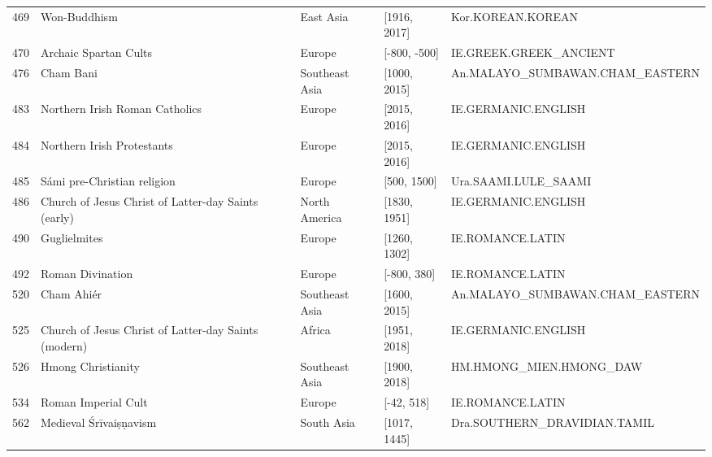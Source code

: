 {\begin{longtable}{rp{3.5cm}llp{3.5cm}}
469 & {\raggedright Won-Buddhism} & East Asia & [1916, 2017] & {\raggedright Kor.\allowbreak{}KOREAN.\allowbreak{}KOREAN} \\
470 & {\raggedright Archaic Spartan Cults} & Europe & [-800, -500] & {\raggedright IE.\allowbreak{}GREEK.\allowbreak{}GREEK\_\allowbreak{}ANCIENT} \\
476 & {\raggedright Cham Bani} & Southeast Asia & [1000, 2015] & {\raggedright An.\allowbreak{}MALAYO\_\allowbreak{}SUMBAWAN.\allowbreak{}CHAM\_\allowbreak{}EASTERN} \\
483 & {\raggedright Northern Irish Roman Catholics} & Europe & [2015, 2016] & {\raggedright IE.\allowbreak{}GERMANIC.\allowbreak{}ENGLISH} \\
484 & {\raggedright Northern Irish Protestants} & Europe & [2015, 2016] & {\raggedright IE.\allowbreak{}GERMANIC.\allowbreak{}ENGLISH} \\
485 & {\raggedright Sámi pre-Christian religion} & Europe & [500, 1500] & {\raggedright Ura.\allowbreak{}SAAMI.\allowbreak{}LULE\_\allowbreak{}SAAMI} \\
486 & {\raggedright Church of Jesus Christ of Latter-day Saints (early)} & North America & [1830, 1951] & {\raggedright IE.\allowbreak{}GERMANIC.\allowbreak{}ENGLISH} \\
490 & {\raggedright Guglielmites} & Europe & [1260, 1302] & {\raggedright IE.\allowbreak{}ROMANCE.\allowbreak{}LATIN} \\
492 & {\raggedright Roman Divination} & Europe & [-800, 380] & {\raggedright IE.\allowbreak{}ROMANCE.\allowbreak{}LATIN} \\
520 & {\raggedright Cham Ahiér} & Southeast Asia & [1600, 2015] & {\raggedright An.\allowbreak{}MALAYO\_\allowbreak{}SUMBAWAN.\allowbreak{}CHAM\_\allowbreak{}EASTERN} \\
525 & {\raggedright Church of Jesus Christ of Latter-day Saints (modern)} & Africa & [1951, 2018] & {\raggedright IE.\allowbreak{}GERMANIC.\allowbreak{}ENGLISH} \\
526 & {\raggedright Hmong Christianity} & Southeast Asia & [1900, 2018] & {\raggedright HM.\allowbreak{}HMONG\_\allowbreak{}MIEN.\allowbreak{}HMONG\_\allowbreak{}DAW} \\
534 & {\raggedright Roman Imperial Cult} & Europe & [-42, 518] & {\raggedright IE.\allowbreak{}ROMANCE.\allowbreak{}LATIN} \\
562 & {\raggedright Medieval Śrīvaiṣṇavism} & South Asia & [1017, 1445] & {\raggedright Dra.\allowbreak{}SOUTHERN\_\allowbreak{}DRAVIDIAN.\allowbreak{}TAMIL} \\

\end{longtable}}
